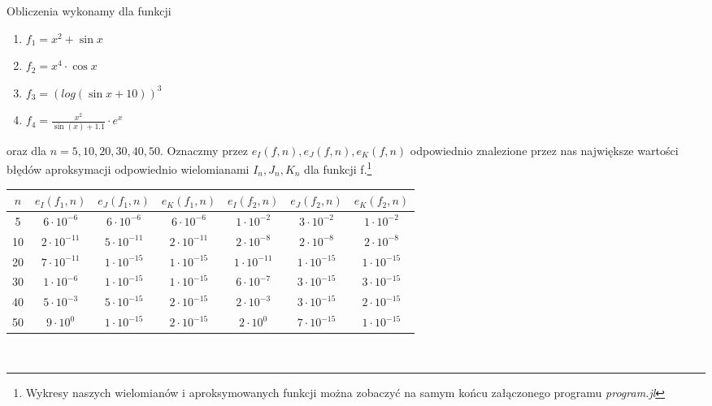 \documentclass[12pt,wide]{mwart}
\begin{document}
Obliczenia wykonamy dla funkcji
\begin{enumerate}
\item $f_1 = x^2 + \sin x$
\item $f_2 = x^4 \cdot \cos x$
\item $f_3 = \left( log(\sin x + 10) \right)^3$
\item $f_4 = \frac{x^2}{\sin(x)+1.1} \cdot e^x$
\end{enumerate}

oraz dla $n = 5,10,20,30,40,50$. Oznaczmy przez $e_I(f,n), e_J(f,n), e_K(f,n)$ odpowiednio znalezione przez nas największe wartości błędów aproksymacji odpowiednio wielomianami $I_n,J_n,K_n$ dla funkcji f.\footnote{Wykresy naszych wielomianów i aproksymowanych funkcji można zobaczyć na samym końcu załączonego programu \textit{program.jl}}\\

\begin{tabular}{|c|c|c|c|c|c|c|}
\hline 
$n$ & $e_I(f_1,n)$ & $e_J(f_1,n)$ & $e_K(f_1,n)$ & $e_I(f_2,n)$ & $e_J(f_2,n)$ & $e_K(f_2,n)$ \\ 
\hline 
5 & $6\cdot 10^{-6}$ & $6\cdot 10^{-6}$ & $6\cdot 10^{-6}$ & $1\cdot 10^{-2}$ & $3\cdot 10^{-2}$ & $1\cdot 10^{-2}$ \\ 
\hline 
10 & $2\cdot 10^{-11}$ & $5\cdot 10^{-11}$ & $2\cdot 10^{-11}$ & $2\cdot 10^{-8}$ & $2\cdot 10^{-8}$ & $2\cdot 10^{-8}$ \\ 
\hline 
20 & $7\cdot 10^{-11}$ & $1\cdot 10^{-15}$ & $1\cdot 10^{-15}$ & $1\cdot 10^{-11}$ & $1\cdot 10^{-15}$ & $1\cdot 10^{-15}$ \\ 
\hline 
30 & $1\cdot 10^{-6}$ & $1\cdot 10^{-15}$ & $1\cdot10^{-15}$ & $6\cdot 10^{-7}$ & $3\cdot 10^{-15}$ & $3\cdot 10^{-15}$ \\ 
\hline 
40 & $5\cdot 10^{-3}$ & $5\cdot 10^{-15}$ & $2\cdot 10^{-15}$ & $2\cdot 10^{-3}$ & $3\cdot 10^{-15}$ & $2\cdot 10^{-15}$ \\ 
\hline 
50 & $9\cdot 10^{0}$ & $1\cdot 10^{-15}$ & $2\cdot 10^{-15}$ & $2\cdot 10^{0}$ & $7\cdot 10^{-15}$ & $1\cdot 10^{-15}$ \\ 
\hline 
\end{tabular} \\
\end{document}
